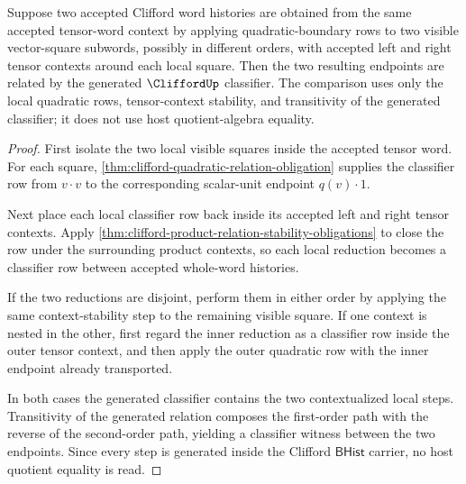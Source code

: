\begin{theorem}
\label{thm:clifford-quadratic-boundary-confluence}
Suppose two accepted Clifford word histories are obtained from the same accepted
tensor-word context by applying quadratic-boundary rows to two visible
vector-square subwords, possibly in different orders, with accepted left and
right tensor contexts around each local square. Then the two resulting endpoints
are related by the generated $\CliffordUp$ classifier. The comparison uses only
the local quadratic rows, tensor-context stability, and transitivity of the
generated classifier; it does not use host quotient-algebra equality.
\end{theorem}
\begin{proof}
First isolate the two local visible squares inside the accepted tensor word. For
each square, \autoref{thm:clifford-quadratic-relation-obligation} supplies the
classifier row from $v \cdot v$ to the corresponding scalar-unit endpoint
$q(v) \cdot 1$.

Next place each local classifier row back inside its accepted left and right
tensor contexts. Apply
\autoref{thm:clifford-product-relation-stability-obligations} to close the row
under the surrounding product contexts, so each local reduction becomes a
classifier row between accepted whole-word histories.

If the two reductions are disjoint, perform them in either order by applying the
same context-stability step to the remaining visible square. If one context is
nested in the other, first regard the inner reduction as a classifier row inside
the outer tensor context, and then apply the outer quadratic row with the inner
endpoint already transported.

In both cases the generated classifier contains the two contextualized local
steps. Transitivity of the generated relation composes the first-order path with
the reverse of the second-order path, yielding a classifier witness between the
two endpoints. Since every step is generated inside the Clifford
$\mathsf{BHist}$ carrier, no host quotient equality is read.
\end{proof}

